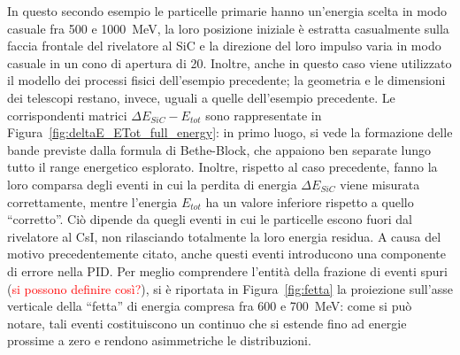 In questo secondo esempio le particelle primarie hanno un'energia scelta in modo casuale fra 500 e 1000~MeV, la loro posizione iniziale è estratta casualmente sulla faccia frontale del rivelatore al SiC e la direzione del loro impulso varia in modo casuale in un cono di apertura di 20\textdegree{}.
Inoltre, anche in questo caso viene utilizzato il modello dei processi fisici dell'esempio precedente; la geometria e le dimensioni dei telescopi restano, invece, uguali a quelle dell'esempio precedente.
Le corrispondenti matrici $\Delta E_{SiC} - E_{tot}$ sono rappresentate in Figura~\ref{fig:deltaE_ETot_full_energy}: in primo luogo, si vede la formazione delle bande previste dalla formula di Bethe-Block, che appaiono ben separate lungo tutto il range energetico esplorato.
Inoltre, rispetto al caso precedente, fanno la loro comparsa degli eventi in cui la perdita di energia $\Delta E_{SiC}$ viene misurata correttamente, mentre l'energia $E_{tot}$ ha un valore inferiore rispetto a quello ``corretto''. 
Ciò dipende da quegli eventi in cui le particelle escono fuori dal rivelatore al CsI, non rilasciando totalmente la loro energia residua.
A causa del motivo precedentemente citato, anche questi eventi introducono una componente di errore nella PID.
Per meglio comprendere l'entità della frazione di eventi spuri (\textcolor{red}{si possono definire così?}), si è riportata in Figura~\ref{fig:fetta} la proiezione sull'asse verticale della ``fetta'' di energia compresa fra 600 e 700~MeV: come si può notare, tali eventi costituiscono un continuo che si estende fino ad energie prossime a zero e rendono asimmetriche le distribuzioni. 


